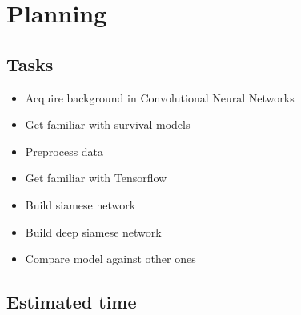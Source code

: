 \section{Planning}
\subsection{Tasks}
\begin{frame}{\insertsubsec}
  \begin{itemize}
    \item Acquire background in Convolutional Neural Networks
    \item Get familiar with survival models
    \item Preprocess data
    \item Get familiar with Tensorflow
    \item Build siamese network
    \item Build deep siamese network
    \item Compare model against other ones
  \end{itemize}
\end{frame}

\subsection{Estimated time}
  
    

